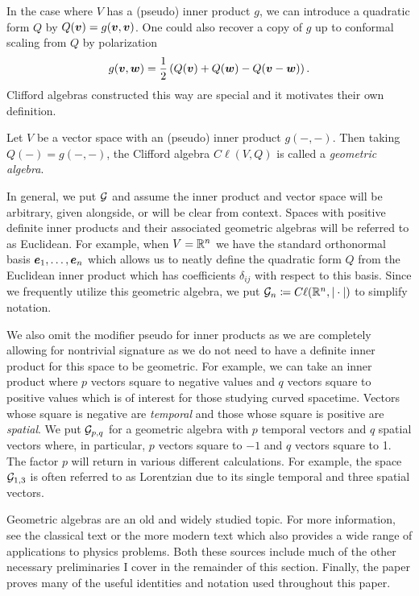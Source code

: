 In the case where $V$ has a (pseudo) inner product $g$, we can introduce a quadratic form $Q$ by $Q(\boldsymbol{v})=g(\boldsymbol{v},\boldsymbol{v})$. One could also recover a copy of $g$ up to conformal scaling from $Q$ by polarization
\begin{equation}
g(\boldsymbol{v},\boldsymbol{w})=\frac{1}{2} \left(Q(\boldsymbol{v})+Q(\boldsymbol{w})-Q(\boldsymbol{v}-\boldsymbol{w})\right).
\end{equation}
Clifford algebras constructed this way are special and it motivates their own definition.
\begin{definition}
Let $V$ be a vector space with an (pseudo) inner product $g(-,-)$. Then taking $Q(-) = g(-,-)$, the Clifford algebra $C \ell(V,Q)$ is called a \emph{geometric algebra}.
\end{definition}
In general, we put $\mathcal{G}$ and assume the inner product and vector space will be arbitrary, given alongside, or will be clear from context. Spaces with positive definite inner products and their associated geometric algebras will be referred to as Euclidean. For example, when $V=\mathbb{R}^n$ we have the standard orthonormal basis $\boldsymbol{e}_1,\dots,\boldsymbol{e}_n$ which allows us to neatly define the quadratic form $Q$ from the Euclidean inner product which has coefficients $\delta_{ij}$ with respect to this basis. Since we frequently utilize this geometric algebra, we put $\mathcal{G}_n \coloneqq C\ell(\mathbb{R}^n, |\cdot|)$ to simplify notation. 

We also omit the modifier pseudo for inner products as we are completely allowing for nontrivial signature as we do not need to have a definite inner product for this space to be geometric. For example, we can take an inner product where $p$ vectors square to negative values and $q$ vectors square to positive values which is of interest for those studying curved spacetime. Vectors whose square is negative are \emph{temporal} and those whose square is positive are \emph{spatial}. We put $\mathcal{G}_{p,q}$ for a geometric algebra with $p$ temporal vectors and $q$ spatial vectors where, in particular, $p$ vectors square to $-1$ and $q$ vectors square to 1. The factor $p$ will return in various different calculations. For example, the space $\mathcal{G}_{1,3}$ is often referred to as Lorentzian due to its single temporal and three spatial vectors.

Geometric algebras are an old and widely studied topic. For more information, see the classical text \cite{hestenes_clifford_1986} or the more modern text \cite{doran_geometric_2003} which also provides a wide range of applications to physics problems. Both these sources include much of the other necessary preliminaries I cover in the remainder of this section. Finally, the paper \cite{chisolm_geometric_2012} proves many of the useful identities and notation used throughout this paper.

